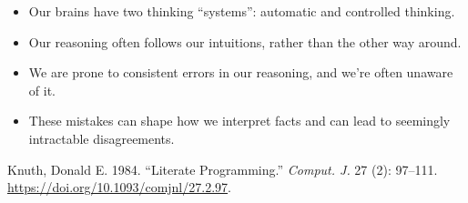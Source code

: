 \documentclass[
  letterpaper,
  DIV=11,
  numbers=noendperiod]{scrreprt}
\providecommand{\tightlist}{%
  \setlength{\itemsep}{0pt}\setlength{\parskip}{0pt}}\usepackage{longtable,booktabs,array}
\newlength{\cslhangindent}
\newlength{\cslentryspacingunit} %
\newenvironment{CSLReferences}[2] %
 {%
  \setlength{\parindent}{0pt}
  \ifodd #1
  \let\oldpar\par
  \def\par{\hangindent=\cslhangindent\oldpar}
  \fi
  \setlength{\parskip}{#2\cslentryspacingunit}
 }%
 {}
\begin{document}
\begin{itemize}
\tightlist
\item
  Our brains have two thinking ``systems'': automatic and controlled
  thinking.
\item
  Our reasoning often follows our intuitions, rather than the other way
  around.
\item
  We are prone to consistent errors in our reasoning, and we're often
  unaware of it.
\item
  These mistakes can shape how we interpret facts and can lead to
  seemingly intractable disagreements.
\end{itemize}

\hypertarget{refs}{}
\begin{CSLReferences}{1}{0}
\leavevmode{}%
Knuth, Donald E. 1984. {``Literate Programming.''} \emph{Comput. J.} 27
(2): 97--111. \url{https://doi.org/10.1093/comjnl/27.2.97}.

\end{CSLReferences}
\end{document}
